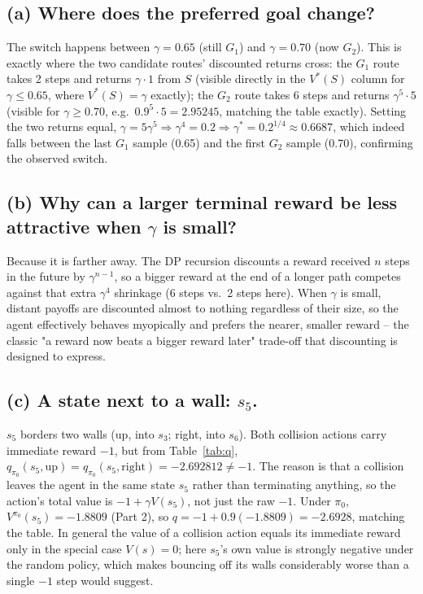 \documentclass[11pt]{article}
\begin{document}
\subsection*{(a) Where does the preferred goal change?}
The switch happens between $\gamma = 0.65$ (still $G_1$) and $\gamma = 0.70$
(now $G_2$). This is exactly where the two candidate routes' discounted
returns cross: the $G_1$ route takes 2 steps and returns $\gamma \cdot 1$ from
$S$ (visible directly in the $V^\ast(S)$ column for $\gamma \le 0.65$, where
$V^\ast(S) = \gamma$ exactly); the $G_2$ route takes 6 steps and returns
$\gamma^5 \cdot 5$ (visible for $\gamma \ge 0.70$, e.g.\ $0.9^5 \cdot 5 =
2.95245$, matching the table exactly). Setting the two returns equal,
$\gamma = 5\gamma^5 \Rightarrow \gamma^4 = 0.2 \Rightarrow \gamma^\ast =
0.2^{1/4} \approx 0.6687$, which indeed falls between the last $G_1$ sample
(0.65) and the first $G_2$ sample (0.70), confirming the observed switch.

\subsection*{(b) Why can a larger terminal reward be less attractive when $\gamma$ is small?}
Because it is farther away. The DP recursion discounts a reward received $n$
steps in the future by $\gamma^{n-1}$, so a bigger reward at the end of a
longer path competes against that extra $\gamma^4$ shrinkage (6 steps vs.\ 2
steps here). When $\gamma$ is small, distant payoffs are discounted almost to
nothing regardless of their size, so the agent effectively behaves myopically
and prefers the nearer, smaller reward -- the classic "a reward now beats a
bigger reward later" trade-off that discounting is designed to express.

\subsection*{(c) A state next to a wall: $s_5$.}
$s_5$ borders two walls (up, into $s_3$; right, into $s_6$). Both collision
actions carry immediate reward $-1$, but from Table~\ref{tab:q},
$q_{\pi_0}(s_5,\text{up}) = q_{\pi_0}(s_5,\text{right}) = -2.692812 \ne -1$.
The reason is that a collision leaves the agent in the same state $s_5$
rather than terminating anything, so the action's total value is
$-1 + \gamma V(s_5)$, not just the raw $-1$. Under $\pi_0$, $V^{\pi_0}(s_5) =
-1.8809$ (Part 2), so $q = -1 + 0.9(-1.8809) = -2.6928$, matching the table.
In general the value of a collision action equals its immediate reward only
in the special case $V(s) = 0$; here $s_5$'s own value is strongly negative
under the random policy, which makes bouncing off its walls considerably
worse than a single $-1$ step would suggest.
\end{document}

